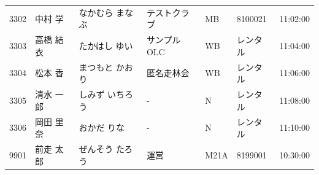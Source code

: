 \documentclass[a4paper,10pt]{ltjsarticle}
\begin{document}
\begin{longtable}{r>{\raggedright\arraybackslash}p{}>{\raggedright\arraybackslash}p{}>{\raggedright\arraybackslash}p{}lll}
3302 & 中村 学 & なかむら まなぶ & テストクラブ & MB & 8100021 & 11:02:00 \\
3303 & 高橋 結衣 & たかはし ゆい & サンプルOLC & WB & レンタル & 11:04:00 \\
3304 & 松本 香 & まつもと かおり & 匿名走林会 & WB & レンタル & 11:06:00 \\
3305 & 清水 一郎 & しみず いちろう & - & N & レンタル & 11:08:00 \\
3306 & 岡田 里奈 & おかだ りな & - & N & レンタル & 11:10:00 \\
9901 & 前走 太郎 & ぜんそう たろう & 運営 & M21A & 8199001 & 10:30:00 \\
\end{longtable}
\end{document}
